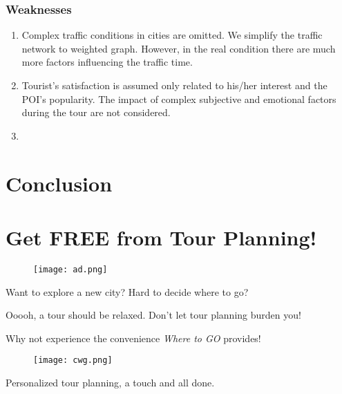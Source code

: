 \documentclass{mcmthesis}
\begin{document}
\subsubsection{Weaknesses}
  \begin{enumerate}
    \item Complex traffic conditions in cities are omitted. We simplify the traffic network to weighted graph. However, in the real condition there are much more factors influencing the traffic time.
    \item Tourist's satisfaction is assumed only related to his/her interest and the POI's popularity. The impact of complex subjective and emotional factors during the tour are not considered.
    \item 
  \end{enumerate}

\section{Conclusion}








\newpage
\section*{Get FREE from Tour Planning!}
  \begin{figure}[ht]
    \centering
    \texttt{[image: ad.png]}
  \end{figure}
Want to explore a new city? Hard to decide where to go? \par
Ooooh, a tour should be relaxed. Don't let tour planning burden you! \par
  \centering
Why not experience the convenience \emph{Where to GO} provides!\par
  \begin{figure}[ht]
    \centering
    \texttt{[image: cwg.png]}
  \end{figure}
\begin{large}
  Personalized tour planning, a touch and all done.
\end{large}

	

	
\newpage

\begin{appendices}

\end{appendices}
\end{document}
